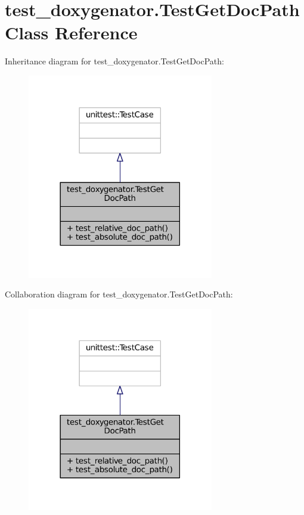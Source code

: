 \hypertarget{classtest__doxygenator_1_1TestGetDocPath}{}\section{test\+\_\+doxygenator.\+Test\+Get\+Doc\+Path Class Reference}
\label{classtest__doxygenator_1_1TestGetDocPath}


Inheritance diagram for test\+\_\+doxygenator.\+Test\+Get\+Doc\+Path\+:
\nopagebreak
\begin{figure}[H]
\begin{center}
\leavevmode
\includegraphics[width=230pt]{classtest__doxygenator_1_1TestGetDocPath__inherit__graph}
\end{center}
\end{figure}


Collaboration diagram for test\+\_\+doxygenator.\+Test\+Get\+Doc\+Path\+:
\nopagebreak
\begin{figure}[H]
\begin{center}
\leavevmode
\includegraphics[width=230pt]{classtest__doxygenator_1_1TestGetDocPath__coll__graph}
\end{center}
\end{figure}
